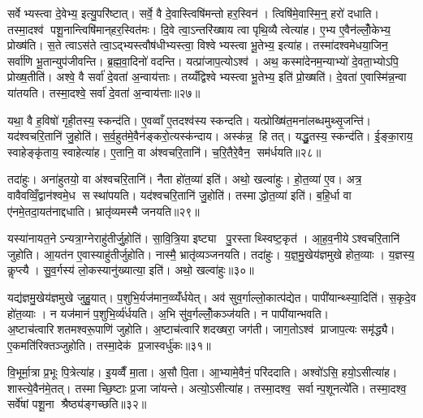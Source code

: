 सर्वेभ्यस्त्वा दे॒वेभ्य॒ इत्यु॒परि॑ष्टात्। सर्वे॒ वै दे॒वास्त्विषि॑मन्तो हर॒स्विन॑। त्विषि॑मे॒वास्मि॒न्॒ हरो॑ दधाति। तस्मा॒दश्व॑ पशू॒नान्त्विषि॑मान्‌हर॒स्वित॑मः। दि॒वे त्वा॒ऽन्तरि॑ख्षाय त्वा पृथि॒व्यै त्वेत्या॑ह। ए॒भ्य ए॒वैन॑ल्लोँ॒केभ्य॒ प्रोख्ष॑ति। स॒ते त्वाऽस॑ते त्वा॒ऽद्भ्यस्त्वौष॑धीभ्यस्त्वा॒ विश्वेभ्यस्त्वा भू॒तेभ्य॒ इत्या॑ह। तस्मा॑दश्वमेधया॒जिन॒ सर्वा॑णि भू॒तान्युप॑जीवन्ति। ब्र॒ह्म॒वा॒दिनो॑ वदन्ति। यत्प्रा॑जाप॒त्योऽश्व॑। अथ॒ कस्मा॑देनम॒न्याभ्यो॑ दे॒वता॒भ्योऽपि॒ प्रोख्ष॒तीति॑। अश्वे॒ वै सर्वा॑ दे॒वता॑ अ॒न्वाय॑त्ताः। तय्यँद्विश्वेभ्यस्त्वा भू॒तेभ्य॒ इति॑ प्रो॒ख्षति॑। दे॒वता॑ ए॒वास्मि॑न्न॒न्वा या॑तयति। तस्मा॒दश्वे॒ सर्वा॑ दे॒वता॑ अ॒न्वाय॑त्ताः॥२७॥\anuvakamend[सा॒र॒सा॒रित॒मोऽप॑चिततमः प्राजाप॒त्योऽश्व॒ पञ्च॑ च]

यथा॒ वै ह॒विषो॑ गृही॒तस्य॒ स्कन्द॑ति। ए॒वव्वाँ ए॒तदश्व॑स्य स्कन्दति। यत्प्रोख्षि॑त॒मना॑लब्धमुथ्सृ॒जन्ति॑। यद॑श्वचरि॒तानि॑ जु॒होति॑। स॒र्व॒हुत॑मे॒वैन॑ङ्करो॒त्यस्क॑न्दाय। अस्क॑न्न॒ हि तत्। यद्धु॒तस्य॒ स्कन्द॑ति। ई॒ङ्का॒राय॒ स्वाहेङ्कृ॑ताय॒ स्वाहेत्या॑ह। ए॒तानि॒ वा अ॑श्वचरि॒तानि॑। च॒रि॒तैरे॒वैन॒ सम॑र्धयति॥२८॥

तदा॑हुः। अना॑हुतयो॒ वा अ॑श्वचरि॒तानि॑। नैता हो॑त॒व्या॑ इति॑। अथो॒ खल्वा॑हुः। हो॒त॒व्या॑ ए॒व। अत्र॒ वावैवव्विँ॒द्वान॑श्वमे॒ध सस्था॑पयति। यद॑श्वचरि॒तानि॑ जु॒होति॑। तस्माद्धोत॒व्या॑ इति॑। ब॒हि॒र्धा वा ए॑नमे॒तदा॒यत॑नाद्दधाति। भ्रातृ॑व्यमस्मै जनयति॥२९॥

यस्या॑नायत॒नेऽन्यत्रा॒ग्नेराहु॑तीर्जु॒होति॑। सा॒वि॒त्रि॒या इष्ट्या पु॒रस्ताथ्स्विष्ट॒कृत॑। आ॒ह॒व॒नीयेऽश्वचरि॒तानि॑ जुहोति। आ॒यत॑न ए॒वास्याहु॑तीर्जुहोति। नास्मै॒ भ्रातृ॑व्यञ्जनयति। तदा॑हुः। य॒ज्ञ॒मु॒खेय॑ज्ञमुखे होत॒व्याः। य॒ज्ञस्य॒ कॢप्त्यै। सु॒व॒र्गस्य॑ लो॒कस्यानु॑ख्यात्या॒ इति॑। अथो॒ खल्वा॑हुः॥३०॥

यद्य॑ज्ञमु॒खेय॑ज्ञमुखे जुहु॒यात्। प॒शुभि॒र्यज॑मान॒व्व्यँ॑र्धयेत्। अव॑ सुव॒र्गाल्लो॒कात्प॑द्येत। पापी॑यान्थ्स्या॒दिति॑। स॒कृदे॒व हो॑त॒व्याः। न यज॑मानं प॒शुभि॒र्व्य॑र्धयति। अ॒भि सु॑व॒र्गल्लोँ॒कञ्ज॑यति। न पापी॑यान्भवति। अ॒ष्टाच॑त्वारिशतमश्वरू॒पाणि॑ जुहोति। अ॒ष्टाच॑त्वारिशदख्षरा॒ जग॑ती। जाग॒तोऽश्व॑ प्राजाप॒त्यः समृ॑द्ध्यै। ए॒कमति॑रिक्तञ्जुहोति। तस्मा॒देक॑ प्र॒जास्वर्धु॑कः॥३१॥\anuvakamend[अ॒र्ध॒य॒ति॒ ज॒न॒य॒ति॒ खल्वा॑हु॒र्जग॑ती॒ त्रीणि॑ च]

वि॒भूर्मा॒त्रा प्र॒भूः पि॒त्रेत्या॑ह। इ॒यव्वैँ मा॒ता। अ॒सौ पि॒ता। आ॒भ्यामे॒वैनं॒ परि॑ददाति। अश्वो॑ऽसि॒ हयो॒ऽसीत्या॑ह। शास्त्ये॒वैन॑मे॒तत्। तस्माच्छि॒ष्टाः प्र॒जा जा॑यन्ते। अत्यो॒ऽसीत्या॑ह। तस्मा॒दश्व॒ सर्वान्प॒शूनत्ये॑ति। तस्मा॒दश्व॒ सर्वे॑षां पशू॒ना श्रैष्ठ्य॑ङ्गच्छति॥३२॥

